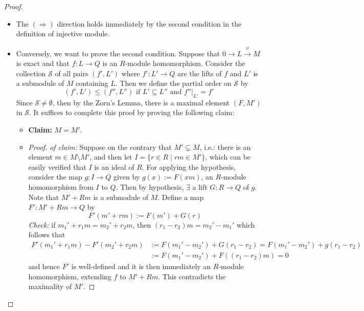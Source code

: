 \begin{proof}
    \begin{itemize}
        \item The $(\Rightarrow)$ direction holds immediately by the second condition in the definition of injective module.

        \item Conversely, we want to prove the second condition. Suppose that $0 \to L \overset{\psi}{\to}  M$ is exact and that $f: L\to Q$ is an $R$-module homomorphism. Consider the collection $\mathcal{S}$ of all pairs $(f',L')$ where $f': L'\to Q$ are the lifts of $f$ and $L'$ is a submodule of $M$ containing $L$. Then we define the partial order on $\mathcal{S}$ by
        \[
        (f',L') \leq (f'',L'') \text{ if } L' \subseteq L'' \text{ and } f''|_{L'} =f'
        \]
        Since $\mathcal{S} \neq \emptyset$, then by the Zorn's Lemma, there is a maximal element $(F,M')$ in $\mathcal{S}$. It suffices to complete this proof by proving the following claim:
        \begin{itemize}
            \item \noindent\textbf{Claim:} $M =M'$.
            \item \begin{proof}
                \textit{of claim:} Suppose on the contrary that $M' \subsetneq M$, i.e.: there is an element $m \in M \setminus M'$, and then let $I = \{ r\in R \mid rm\in M' \}$, which can be easily verified that $I$ is an ideal of $R$. For applying the hypothesis, consider the map $g: I \to Q$ given by $g(x) := F(xm)$, an $R$-module homomorphism from $I$ to $Q$. Then by hypothesis, $\exists$ a lift $G: R\to Q$ of $g$. Note that $M' +Rm$ is a submodule of $M$. Define a map $F': M'+Rm \to Q$ by
                $$F'(m'+rm) := F(m') +G(r)$$
                \textit{Check:} if $m_1'+r_1m = m_2'+r_2m$, then $(r_1-r_2) m= m_2'-m_1'$ which follows that 
                \begin{align*}
                    F' (m_1'+r_1m) - F'(m_2'+r_2m) &:= F(m_1' -m_2') +G(r_1-r_2) = F(m_1'-m_2') +g(r_1-r_2)\\
                    &:= F(m_1' -m_2') +F((r_1-r_2)m) =0
                \end{align*}
                and hence $F'$ is well-defined and it is then immediately an $R$-module homomorphism, extending $f$ to $M'+Rm$. This contradicts the maximality of $M'$.
            \end{proof}
        \end{itemize}
    \end{itemize}
\end{proof}

